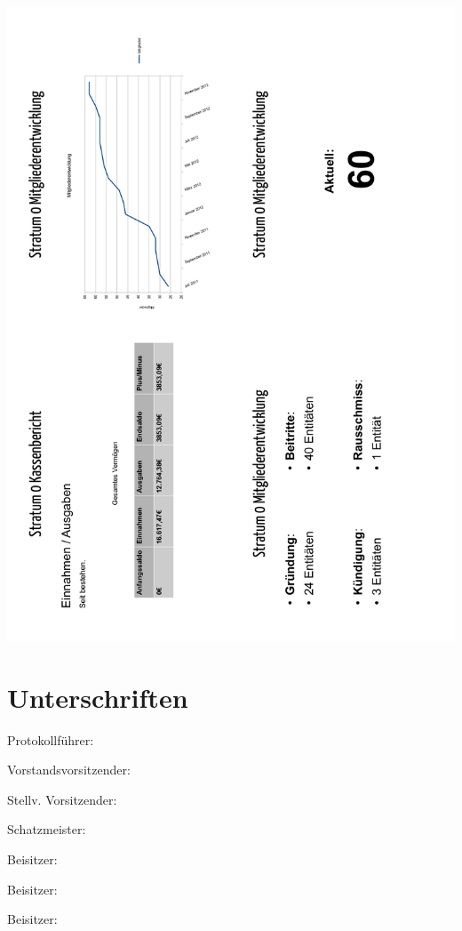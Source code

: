 \documentclass[a4paper,12pt]{scrartcl}
\begin{document}
\includegraphics[height=\textheight]{images/Kassenbericht_2012_2.pdf}

\section{Unterschriften}
\vspace{0.7cm}
\noindent Protokollführer: \hrulefill\hfill\phantom{c}\par
\vspace{0.7cm}
\noindent Vorstandsvorsitzender: \hrulefill\hfill\phantom{c}\par
\vspace{0.7cm}
\noindent Stellv. Vorsitzender: \hrulefill\hfill\phantom{c}\par
\vspace{0.7cm}
\noindent Schatzmeister: \hrulefill\hfill\phantom{c}\par
\vspace{0.7cm}
\noindent Beisitzer: \hrulefill\hfill\phantom{c}\par
\vspace{0.7cm}
\noindent Beisitzer: \hrulefill\hfill\phantom{c}\par
\vspace{0.7cm}
\noindent Beisitzer: \hrulefill\hfill\phantom{c}\par
\end{document}
